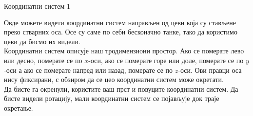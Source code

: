 ﻿\documentclass[en]{./../../common/SurferDesc}%
\begin{document}
\footnotesize
%


\begin{surferPage}
  \begin{surferTitle}Координатни систем 1 \end{surferTitle}
   \begin{surferText}
   
Овде можете видети координатни систем направљен од цеви која су стављене преко стварних оса. Осе су саме по себи бесконачно танке, тако да користимо цеви да бисмо их видели.\\
Координатни систем описује наш тродимензиони простор. Ако се померате лево или десно, померате се по $x$-оси, ако се померате горе или доле, померате се по $y$-оси а ако се померате напред или назад, померате се по $z$-оси. Ови правци оса нису фиксирани, с обзиром да се цео координатни систем може окретати.\\
\vspace{0.3cm}
Да бисте га окренули, користите ваш прст и повуците координатни систем. Да бисте видели ротацију, мали координатни систем се појављује док траје окретање.
     \end{surferText}
\end{surferPage}
\end{document}
